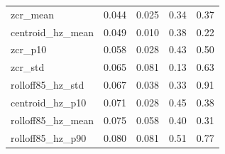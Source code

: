 \documentclass[11pt,a4paper]{article}
\begin{document}
\begin{center}
\begin{longtable}{>{\raggedright\arraybackslash}p{4.20cm}>{\raggedleft\arraybackslash}p{2.55cm}>{\raggedleft\arraybackslash}p{2.55cm}>{\raggedleft\arraybackslash}p{2.55cm}>{\raggedleft\arraybackslash}p{2.55cm}}
\hspace{0pt}zcr\_\allowbreak{}mean & \hspace{0pt}0.044 & \hspace{0pt}0.025 & \hspace{0pt}0.34 & \hspace{0pt}0.37\\
\hspace{0pt}centroid\_\allowbreak{}hz\_\allowbreak{}mean & \hspace{0pt}0.049 & \hspace{0pt}0.010 & \hspace{0pt}0.38 & \hspace{0pt}0.22\\
\hspace{0pt}zcr\_\allowbreak{}p10 & \hspace{0pt}0.058 & \hspace{0pt}0.028 & \hspace{0pt}0.43 & \hspace{0pt}0.50\\
\hspace{0pt}zcr\_\allowbreak{}std & \hspace{0pt}0.065 & \hspace{0pt}0.081 & \hspace{0pt}0.13 & \hspace{0pt}0.63\\
\hspace{0pt}rolloff85\_\allowbreak{}hz\_\allowbreak{}std & \hspace{0pt}0.067 & \hspace{0pt}0.038 & \hspace{0pt}0.33 & \hspace{0pt}0.91\\
\hspace{0pt}centroid\_\allowbreak{}hz\_\allowbreak{}p10 & \hspace{0pt}0.071 & \hspace{0pt}0.028 & \hspace{0pt}0.45 & \hspace{0pt}0.38\\
\hspace{0pt}rolloff85\_\allowbreak{}hz\_\allowbreak{}mean & \hspace{0pt}0.075 & \hspace{0pt}0.058 & \hspace{0pt}0.40 & \hspace{0pt}0.31\\
\hspace{0pt}rolloff85\_\allowbreak{}hz\_\allowbreak{}p90 & \hspace{0pt}0.080 & \hspace{0pt}0.081 & \hspace{0pt}0.51 & \hspace{0pt}0.77\\

\end{longtable}
\end{center}
\end{document}
